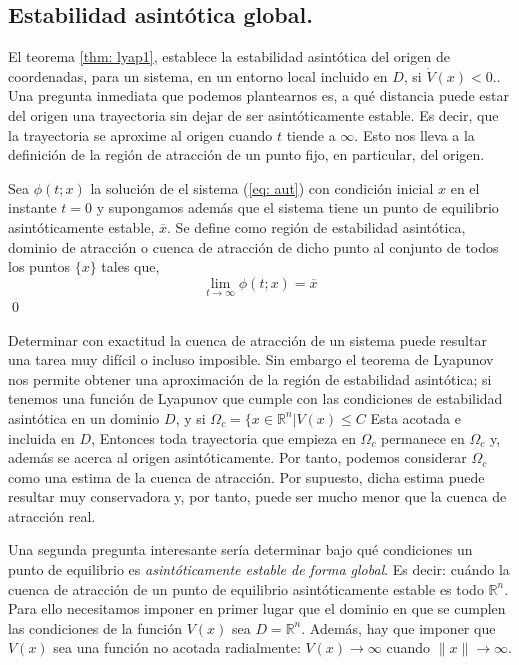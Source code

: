 \subsection{Estabilidad asintótica global.}
El teorema \ref{thm: lyap1}, establece la estabilidad asintótica del origen de coordenadas, para un sistema, en un entorno local incluido en $D$, si $\dot V(x) < 0.$.  Una pregunta inmediata que podemos plantearnos es, a qué distancia puede estar del origen una trayectoria sin dejar de ser asintóticamente estable. Es decir, que la trayectoria se aproxime al origen cuando $t$ tiende a $\infty$. Esto nos lleva a la definición de la región de atracción de un punto fijo, en particular, del origen.
\begin{definition}
Sea $\phi(t;x)$ la solución de el sistema (\ref{eq: aut}) con condición inicial $x$ en el instante $t=0$ y supongamos además que el sistema tiene un punto de equilibrio asintóticamente estable, $\overline x$. Se define como región de estabilidad asintótica, dominio de atracción o cuenca de atracción de dicho punto al conjunto de todos los puntos $\{x\}$ tales que,
\begin{equation}
\lim_{t \to \infty} \phi(t;x) = \overline x
\end{equation}
\qed
\end{definition}

Determinar con exactitud la cuenca de atracción de un sistema puede resultar una tarea muy difícil o incluso imposible. Sin embargo el teorema de Lyapunov nos permite obtener una aproximación de la región de estabilidad asintótica; si tenemos una función de Lyapunov que cumple con las condiciones de estabilidad asintótica en un dominio $D$, y si $\Omega_c =\{x \in \mathbb{R}^n \vert V(x) \leq C$ Esta acotada e incluida en $D$,  Entonces toda trayectoria que empieza en $\Omega_c$ permanece en $\Omega_c$ y, además se acerca al origen asintóticamente. Por tanto, podemos considerar $\Omega_c$ como una estima de la cuenca de atracción. Por supuesto, dicha estima puede resultar muy conservadora y, por  tanto, puede ser mucho menor que la cuenca de atracción real.

Una segunda pregunta interesante sería determinar bajo qué condiciones un punto de equilibrio es \emph{asintóticamente estable de forma global}. Es decir: cuándo la cuenca de atracción de un punto de equilibrio asintóticamente estable es todo $\mathbb{R}^n$.  Para ello necesitamos imponer en primer lugar que el dominio en que se cumplen las condiciones de la función $V(x)$ sea $D=\mathbb{R}^n$. Además, hay que imponer que   $V(x)$ sea una función no acotada radialmente: $V(x) \to \infty$ cuando $\|x\| \to \infty$.

